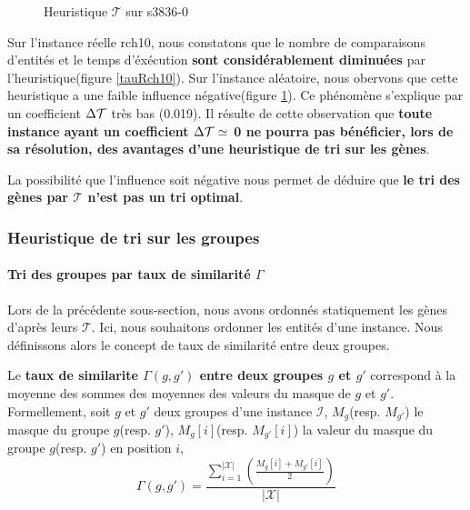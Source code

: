 \begin{figure}
\centering
	\begin{minipage}[c]{0.49\linewidth}
	\centering
	
	\end{minipage}
	\begin{minipage}[c]{0.49\linewidth}
	\centering
	
	\end{minipage}
\caption{Heuristique $\mathcal{T}$ sur s3836-0}
\label{taus3836}
\end{figure}

Sur l'instance réelle rch10, nous constatons que le nombre de comparaisons d'entités  et le temps d'éxécution \textbf{sont considérablement diminuées} par l'heuristique(figure \ref{tauRch10}). Sur l'instance aléatoire, nous obervons que cette heuristique a une faible influence négative(figure \ref{taus3836}). Ce phénomène s'explique par un coefficient $\Delta\cal{T}$ très bas (0.019). Il résulte de cette observation que \textbf{toute instance ayant un coefficient $\Delta\cal{T} \simeq $ 0 ne pourra pas bénéficier, lors de sa résolution, des avantages d'une heuristique de tri sur les gènes}.
 
La possibilité que l'influence soit négative nous permet de déduire que \textbf{le tri des gènes par $\mathcal{T}$ n'est pas un tri optimal}. 


\subsubsection{Heuristique de tri sur les groupes}
\paragraph{Tri des groupes par taux de similarité $\Gamma$}
Lors de la précédente sous-section, nous avons ordonnés statiquement les gènes d'après leurs $\mathcal{T}$. Ici, nous souhaitons ordonner les entités d'une instance. Nous définissons alors le concept de taux de similarité entre deux groupes.

\begin{definition}
Le \textbf{taux de similarite $\Gamma(g,g')$ entre deux groupes $g$ et $g'$ } correspond à la moyenne des sommes des moyennes des valeurs du masque de $g$ et $g'$.\\
Formellement, soit $g$ et $g'$ deux groupes d'une instance $\mathcal{I}$, $M_g$(resp. $M_{g'}$) le masque du groupe $g$(resp. $g'$), $M_g[i]$(resp. $M_{g'}[i]$) la valeur du masque du groupe $g$(resp. $g'$) en position $i$,
$$ \Gamma(g,g')= \frac{\sum_{i=1}^{|\mathcal{X}|}(\frac{M_g[i]+M_{g'}[i]}{2})}{|\mathcal{X}|}$$
\end{definition}

